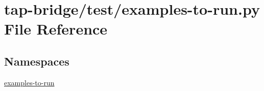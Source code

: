 \hypertarget{tap-bridge_2test_2examples-to-run_8py}{}\section{tap-\/bridge/test/examples-\/to-\/run.py File Reference}
\label{tap-bridge_2test_2examples-to-run_8py}
\subsection*{Namespaces}
\begin{DoxyCompactItemize}
\item 
 \hyperlink{namespaceexamples-to-run}{examples-\/to-\/run}
\end{DoxyCompactItemize}
